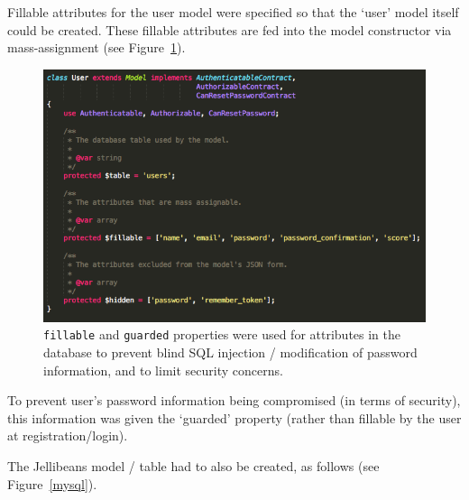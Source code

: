 \documentclass[a4paper, 11pt]{article}
\begin{document}
Fillable attributes for the user model were specified so that the `user' model itself could be created. These fillable attributes are fed into the model constructor via mass-assignment (see Figure~\ref{fillable}). 


\begin{figure}[H]
\begin{center}
\includegraphics[scale=0.5]{fillable}
\caption{\texttt{fillable} and \texttt{guarded} properties were used for attributes in the database to prevent blind SQL injection / modification of password information, and to limit security concerns.}
\label{fillable}
\end{center}
\end{figure}
To prevent user's password information being compromised (in terms of security), this information was given the `guarded' property (rather than fillable by the user at registration/login).

\vspace{5mm}
The Jellibeans model / table had to also be created, as follows (see Figure~\ref{mysql}). 
\end{document}
